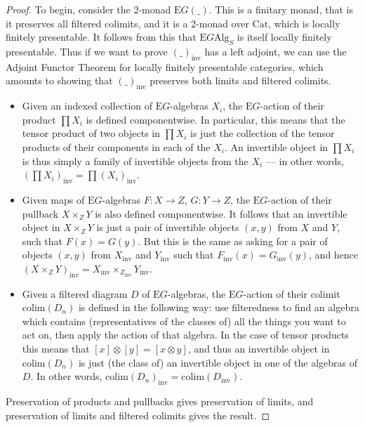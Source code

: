 \documentclass{amsart} %
\begin{document}
\begin{proof} To begin, consider the 2-monad $\mathrm{E}G(\_)$. This is a finitary monad, that is it preserves all filtered colimits, and it is a 2-monad over $\mathrm{Cat}$, which is locally finitely presentable. It follows from this that $\mathrm{E}G\mathrm{Alg}_S$ is itself locally finitely presentable. Thus if we want to prove $(\_)_{\mathrm{inv}}$ has a left adjoint, we can use the Adjoint Functor Theorem for locally finitely presentable categories, which amounts to showing that $(\_)_{\mathrm{inv}}$ preserves both limits and filtered colimits.
\begin{itemize}
\item Given an indexed collection of $\mathrm{E}G$-algebras $X_i$, the $\mathrm{E}G$-action of their product $\prod X_i$ is defined componentwise. In particular, this means that the tensor product of two objects in $\prod X_i$ is just the collection of the tensor products of their components in each of the $X_i$. An invertible object in $\prod X_i$ is thus simply a family of invertible objects from the $X_i$ --- in other words, $(\prod X_i)_{\mathrm{inv}} = \prod (X_i)_{\mathrm{inv}}$.
\item Given maps of $\mathrm{E}G$-algebras $F: X \to Z$, $G : Y \to Z$, the $\mathrm{E}G$-action of their pullback $X \times_Z Y$ is also defined componentwise. It follows that an invertible object in $X \times_Z Y$ is just a pair of invertible objects $(x, y)$ from $X$ and $Y$, such that $F(x) = G(y)$. But this is the same as asking for a pair of objects $(x, y)$ from $X_{\mathrm{inv}}$ and $Y_{\mathrm{inv}}$ such that $F_{\mathrm{inv}}(x) = G_{\mathrm{inv}}(y)$, and hence $(X \times_Z Y)_{\mathrm{inv}} = X_{\mathrm{inv}} \times_{Z_{\mathrm{inv}}} Y_{\mathrm{inv}}$.
\item Given a filtered diagram $D$ of $\mathrm{E}G$-algebras, the $\mathrm{E}G$-action of their colimit $\mathrm{colim}(D_n)$ is defined in the following way: use filteredness to find an algebra which contains (representatives of the classes of) all the things you want to act on, then apply the action of that algebra. In the case of tensor products this means that $[x]\otimes[y] = [x \otimes y]$, and thus an invertible object in $\mathrm{colim}(D_n)$ is just (the class of) an invertible object in one of the algebras of $D$. In other words, $\mathrm{colim}(D_n)_{\mathrm{inv}} = \mathrm{colim}(D_{\mathrm{inv}})$.
\end{itemize}
Preservation of products and pullbacks gives preservation of limits, and preservation of limits and filtered colimits gives the result.
\end{proof}
\end{document}
